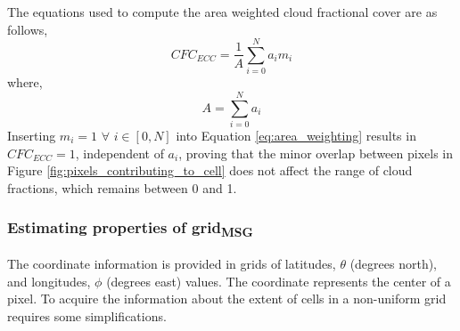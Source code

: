 The equations used to compute the area weighted cloud fractional cover are as follows,
\begin{equation} \label{eq:area_weighting}
    CFC_{ECC} = \frac{1}{A} \sum_{i=0}^{N} a_i m_i
\end{equation}
where,
\begin{equation} \label{eq:tot_area}
    A = \sum_{i=0}^{N} a_i
\end{equation}
Inserting $m_i = 1$ $\forall$ $i \in [0,N]$ into Equation \eqref{eq:area_weighting} results in $CFC_{ECC}=1$, independent of $a_i$, proving that the minor overlap between pixels in Figure \ref{fig:pixels_contributing_to_cell} does not affect the range of cloud fractions, which remains between 0 and 1.

\subsubsection{Estimating properties of grid\textsubscript{MSG}}
The coordinate information is provided in grids of latitudes, $\theta$ (degrees north), and longitudes, $\phi$ (degrees east) values. The coordinate represents the center of a pixel. To acquire the information about the extent of cells in a non-uniform grid requires some simplifications. 


